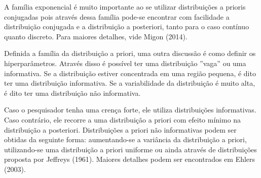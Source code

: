 \documentclass[12pt,a4paper,header]{abnt}
\def\bs{\boldsymbol}
\begin{document}
A família exponencial é muito importante ao se utilizar distribuições a prioris conjugadas pois através dessa família pode-se encontrar com facilidade a distribuição conjugada e a distribuição a posteriori, tanto para o caso contínuo quanto discreto. Para maiores detalhes, vide Migon (2014)\cite{migon}. %



Definida a família da distribuição a priori, uma outra discussão é como definir os hiperparâmetros. Através disso é possível ter uma distribuição ''vaga'' ou uma informativa. Se a distribuição estiver concentrada em uma região pequena, é dito ter uma distribuição informativa. Se a variabilidade da distribuição é muito alta, é dito ter uma distribuição não informativa.

Caso o pesquisador tenha uma crença forte, ele utiliza distribuições informativas. Caso contrário, ele recorre a uma distribuição a priori com efeito mínimo na distribuição a posteriori. Distribuições a priori não informativas podem ser obtidas da seguinte forma: aumentando-se a variância da distribuição a priori, utilizando-se  uma distribuição a priori uniforme ou ainda através de distribuições proposta por Jeffreys (1961)\cite{Jeffreys}. Maiores detalhes podem ser encontrados em Ehlers (2003)\cite{Ehlers}.

\end{document}
